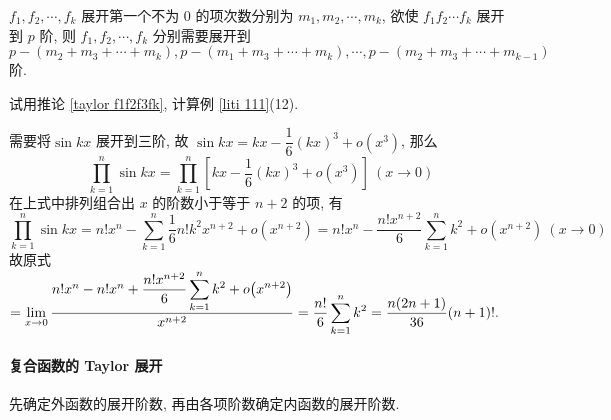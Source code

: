 \begin{inference}
    $f_1,f_2,\cdots,f_k$ 展开第一个不为 0 的项次数分别为 $m_1,m_2,\cdots,m_k$, 欲使 $f_1f_2\cdots f_k$ 展开到 $p$ 阶,
    则 $f_1,f_2,\cdots,f_k$ 分别需要展开到 $p-(m_2+m_3+\cdots+m_k),p-(m_1+m_3+\cdots+m_k),\cdots,p-(m_2+m_3+\cdots+m_{k-1})$ 阶.
    \label{taylor f1f2f3fk}
\end{inference}
\begin{example}
    \scriptsize\linespread{0.8}
    试用推论 \ref{taylor f1f2f3fk}, 计算例 \ref{liti 111}(12).
\end{example}
\begin{solution}
    \scriptsize\linespread{0.8}
    需要将$\sin kx$ 展开到三阶, 故 $\sin kx=kx-\dfrac{1}{6}(kx)^3+o(x^3)$, 那么
    $$\prod_{k=1}^{n}\sin kx=\prod_{k=1}^{n}\left[kx-\dfrac{1}{6}(kx)^3+o(x^3)\right]~ (x\to0)$$
    在上式中排列组合出 $x$ 的阶数小于等于 $n+2$ 的项, 有
    $$\prod_{k=1}^{n}\sin kx=n!x^n-\sum_{k=1}^{n}\dfrac{1}{6}n!k^2x^{n+2}+o(x^{n+2})=n!x^n-\dfrac{n!x^{n+2}}{6}\sum_{k=1}^{n}k^2+o(x^{n+2})~ (x\to0)$$
    故原式$\displaystyle=\lim\limits_{x\to0}\dfrac{n!x^n-n!x^n+\dfrac{n!x^{n+2}}{6}\displaystyle\sum\limits_{k=1}^{n}k^2+o\qty(x^{n+2})}{x^{n+2}}=\dfrac{n!}{6}\sum_{k=1}^{n}k^2=\dfrac{n(2n+1)}{36}(n+1)!.$
\end{solution}

\paragraph{复合函数的 Taylor 展开}
先确定外函数的展开阶数, 再由各项阶数确定内函数的展开阶数.

